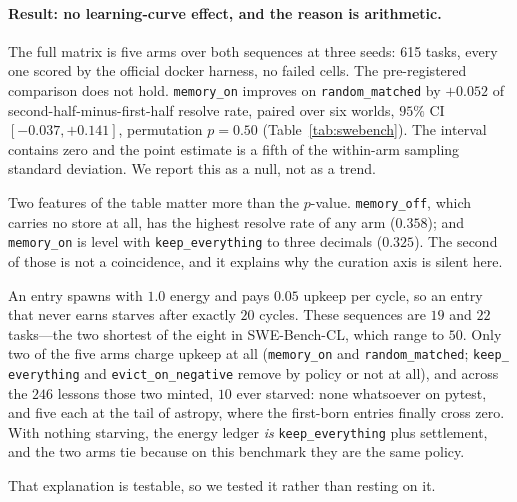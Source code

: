 \paragraph{Result: no learning-curve effect, and the reason is arithmetic.}
The full matrix is five arms over both sequences at three seeds: 615
tasks, every one scored by the official docker harness, no failed cells.
The pre-registered comparison does not hold. \texttt{memory\_on} improves
on \texttt{random\_matched} by $+0.052$ of second-half-minus-first-half
resolve rate, paired over six worlds, $95\%$ CI $[-0.037, +0.141]$,
permutation $p = 0.50$ (Table~\ref{tab:swebench}). The interval contains
zero and the point estimate is a fifth of the within-arm sampling
standard deviation. We report this as a null, not as a trend.

Two features of the table matter more than the $p$-value.
\texttt{memory\_off}, which carries no store at all, has the highest
resolve rate of any arm ($0.358$); and \texttt{memory\_on} is level with
\texttt{keep\_everything} to three decimals ($0.325$). The second of
those is not a coincidence, and it explains why the curation axis is
silent here.

An entry spawns with $1.0$ energy and pays $0.05$ upkeep per cycle, so an
entry that never earns starves after exactly $20$ cycles. These sequences
are $19$ and $22$ tasks---the two shortest of the eight in SWE-Bench-CL,
which range to $50$. Only two of the five arms charge upkeep at all
(\texttt{memory\_on} and \texttt{random\_matched}; \texttt{keep\_%
everything} and \texttt{evict\_on\_negative} remove by policy or not at
all), and across the $246$ lessons those two minted, $10$ ever starved:
none whatsoever on pytest, and five each at the tail of astropy, where
the first-born entries finally cross zero. With nothing starving,
the energy ledger \emph{is} \texttt{keep\_everything} plus settlement,
and the two arms tie because on this benchmark they are the same policy.

That explanation is testable, so we tested it rather than resting on it.


